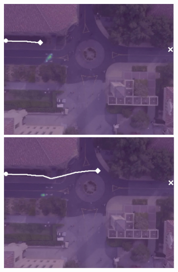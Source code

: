 \documentclass[usenames,dvipsnames]{article}
\begin{document}
\begin{enumerate}
\begin{item}
\begin{figure}[t!]
\begin{subfigure}[t]{0.5\textwidth}
	\vspace{0.1cm}
	\begin{minipage}[c]{0.45cm}
	\end{minipage}
	\begin{minipage}[c]{0.3\linewidth}
		\includegraphics[width=\linewidth]{./figures/comparison/lstm_1_2_t=100.jpg}
	\end{minipage}
	\begin{minipage}[c]{0.3\linewidth}
		\includegraphics[width=\linewidth]{./figures/comparison/lstm_1_2_t=300.jpg}
	\end{minipage}
	\begin{minipage}[c]{0.3\linewidth}

\end{minipage}
\end{subfigure}
\end{figure}
\end{item}
\end{enumerate}
\end{document}
